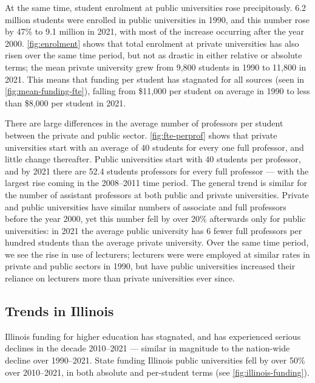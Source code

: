 At the same time, student enrolment at public universities rose precipitously.
6.2 million students were enrolled in public universities in 1990, and this number rose by 47\% to 9.1 million in 2021, with most of the increase occurring after the year 2000.
\autoref{fig:enrolment} shows that total enrolment at private universities has also risen over the same time period, but not as drastic in either relative or absolute terms; the mean private university grew from 9,800 students in 1990 to 11,800 in 2021.
This means that funding per student has stagnated for all sources (seen in \autoref{fig:mean-funding-fte}), falling from \$11,000 per student on average in 1990 to less than \$8,000 per student in 2021.

There are large differences in the average number of professors per student between the private and public sector.
\autoref{fig:fte-perprof} shows that private universities start with an average of 40 students for every one full professor, and little change thereafter.
Public universities start with 40 students per professor, and by 2021 there are 52.4 students professors for every full professor --- with the largest rise coming in the 2008--2011 time period.
The general trend is similar for the number of assistant professors at both public and private universities.
Private and public universities have similar numbers of associate and full professors before the year 2000, yet this number fell by over 20\% afterwards only for public universities: in 2021 the average public university has 6 fewer full professors per hundred students than the average private university.
Over the same time period, we see the rise in use of lecturers; lecturers were were employed at similar rates in private and public sectors in 1990, but have public universities increased their reliance on lecturers more than private universities ever since.

\subsection{Trends in Illinois}
\label{sec:trends-illinois}
Illinois funding for higher education has stagnated, and has experienced serious declines in the decade 2010--2021 --- similar in magnitude to the nation-wide decline over 1990--2021.
State funding Illinois public universities fell by over 50\% over 2010--2021, in both absolute and per-student terms (see \autoref{fig:illinois-funding}).

